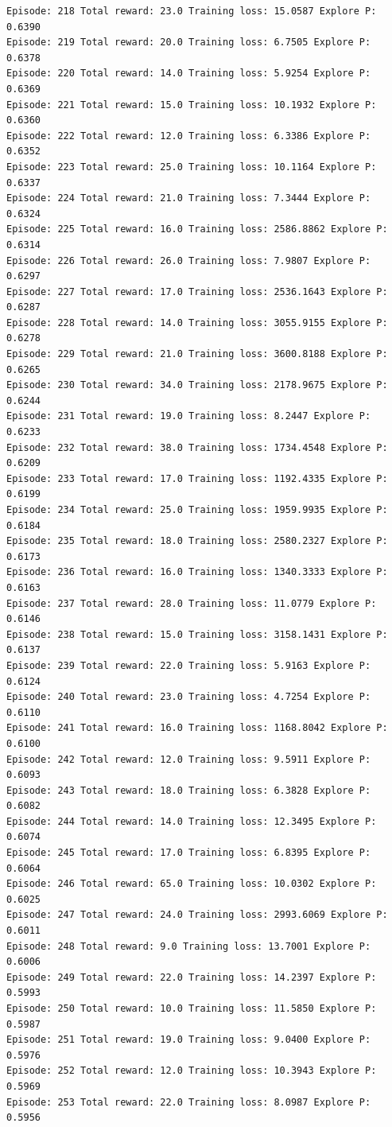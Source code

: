 \documentclass[11pt]{article}
\begin{document}
\begin{Verbatim}[commandchars=\\\{\}]
Episode: 218 Total reward: 23.0 Training loss: 15.0587 Explore P: 0.6390
Episode: 219 Total reward: 20.0 Training loss: 6.7505 Explore P: 0.6378
Episode: 220 Total reward: 14.0 Training loss: 5.9254 Explore P: 0.6369
Episode: 221 Total reward: 15.0 Training loss: 10.1932 Explore P: 0.6360
Episode: 222 Total reward: 12.0 Training loss: 6.3386 Explore P: 0.6352
Episode: 223 Total reward: 25.0 Training loss: 10.1164 Explore P: 0.6337
Episode: 224 Total reward: 21.0 Training loss: 7.3444 Explore P: 0.6324
Episode: 225 Total reward: 16.0 Training loss: 2586.8862 Explore P: 0.6314
Episode: 226 Total reward: 26.0 Training loss: 7.9807 Explore P: 0.6297
Episode: 227 Total reward: 17.0 Training loss: 2536.1643 Explore P: 0.6287
Episode: 228 Total reward: 14.0 Training loss: 3055.9155 Explore P: 0.6278
Episode: 229 Total reward: 21.0 Training loss: 3600.8188 Explore P: 0.6265
Episode: 230 Total reward: 34.0 Training loss: 2178.9675 Explore P: 0.6244
Episode: 231 Total reward: 19.0 Training loss: 8.2447 Explore P: 0.6233
Episode: 232 Total reward: 38.0 Training loss: 1734.4548 Explore P: 0.6209
Episode: 233 Total reward: 17.0 Training loss: 1192.4335 Explore P: 0.6199
Episode: 234 Total reward: 25.0 Training loss: 1959.9935 Explore P: 0.6184
Episode: 235 Total reward: 18.0 Training loss: 2580.2327 Explore P: 0.6173
Episode: 236 Total reward: 16.0 Training loss: 1340.3333 Explore P: 0.6163
Episode: 237 Total reward: 28.0 Training loss: 11.0779 Explore P: 0.6146
Episode: 238 Total reward: 15.0 Training loss: 3158.1431 Explore P: 0.6137
Episode: 239 Total reward: 22.0 Training loss: 5.9163 Explore P: 0.6124
Episode: 240 Total reward: 23.0 Training loss: 4.7254 Explore P: 0.6110
Episode: 241 Total reward: 16.0 Training loss: 1168.8042 Explore P: 0.6100
Episode: 242 Total reward: 12.0 Training loss: 9.5911 Explore P: 0.6093
Episode: 243 Total reward: 18.0 Training loss: 6.3828 Explore P: 0.6082
Episode: 244 Total reward: 14.0 Training loss: 12.3495 Explore P: 0.6074
Episode: 245 Total reward: 17.0 Training loss: 6.8395 Explore P: 0.6064
Episode: 246 Total reward: 65.0 Training loss: 10.0302 Explore P: 0.6025
Episode: 247 Total reward: 24.0 Training loss: 2993.6069 Explore P: 0.6011
Episode: 248 Total reward: 9.0 Training loss: 13.7001 Explore P: 0.6006
Episode: 249 Total reward: 22.0 Training loss: 14.2397 Explore P: 0.5993
Episode: 250 Total reward: 10.0 Training loss: 11.5850 Explore P: 0.5987
Episode: 251 Total reward: 19.0 Training loss: 9.0400 Explore P: 0.5976
Episode: 252 Total reward: 12.0 Training loss: 10.3943 Explore P: 0.5969
Episode: 253 Total reward: 22.0 Training loss: 8.0987 Explore P: 0.5956

\end{Verbatim}
\end{document}
